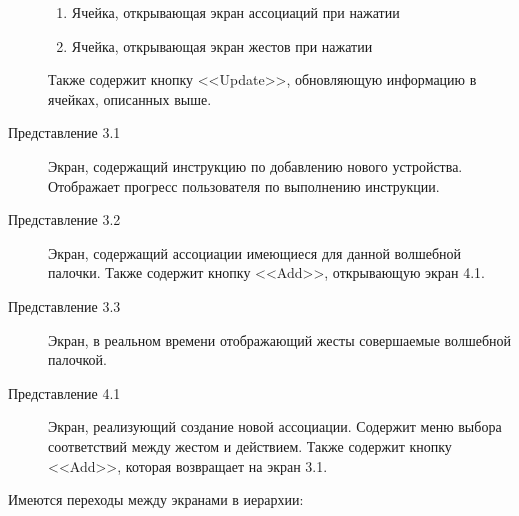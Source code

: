 \begin{description}
\begin{enumerate}
    \item Ячейка, открывающая экран ассоциаций при нажатии
    \item Ячейка, открывающая экран жестов при нажатии
\end{enumerate}
Также содержит кнопку <<Update>>, обновляющую информацию в ячейках, описанных выше.
  \item [Представление 3.1] Экран, содержащий инструкцию по добавлению нового устройства. Отображает прогресс пользователя по выполнению инструкции.
    \item [Представление 3.2] Экран, содержащий ассоциации имеющиеся для данной волшебной палочки. Также содержит кнопку <<Add>>, открывающую экран 4.1.
    \item [Представление 3.3] Экран, в реальном времени отображающий жесты совершаемые волшебной палочкой.
    \item [Представление 4.1] Экран, реализующий создание новой ассоциации. Содержит меню выбора соответствий между жестом и действием. Также содержит кнопку <<Add>>, которая возвращает на экран 3.1. 
 \end{description}
 Имеются переходы между экранами в иерархии:
